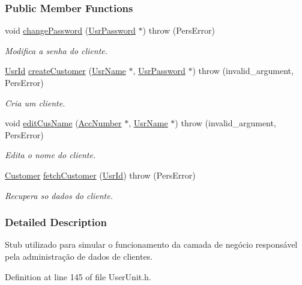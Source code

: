 \subsubsection*{Public Member Functions}
\begin{DoxyCompactItemize}
\item 
void \hyperlink{classStubUserCusAdm_a7e44bec3dc4fb0640e6eb418dd8e8320}{change\-Password} (\hyperlink{classUsrPassword}{Usr\-Password} $\ast$)  throw (\-Pers\-Error)
\begin{DoxyCompactList}\small\item\em Modifica a senha do cliente. \end{DoxyCompactList}\item 
\hyperlink{classUsrId}{Usr\-Id} \hyperlink{classStubUserCusAdm_a6b0c9fc7280045d06bf263d7286b37e9}{create\-Customer} (\hyperlink{classUsrName}{Usr\-Name} $\ast$, \hyperlink{classUsrPassword}{Usr\-Password} $\ast$)  throw (invalid\-\_\-argument, Pers\-Error)
\begin{DoxyCompactList}\small\item\em Cria um cliente. \end{DoxyCompactList}\item 
void \hyperlink{classStubUserCusAdm_a84ca3047ccb0ac2e371a23c4e4fcdba0}{edit\-Cus\-Name} (\hyperlink{classAccNumber}{Acc\-Number} $\ast$, \hyperlink{classUsrName}{Usr\-Name} $\ast$)  throw (invalid\-\_\-argument, Pers\-Error)
\begin{DoxyCompactList}\small\item\em Edita o nome do cliente. \end{DoxyCompactList}\item 
\hyperlink{classCustomer}{Customer} \hyperlink{classStubUserCusAdm_aac14b018a6284211b1c83c48a9529efe}{fetch\-Customer} (\hyperlink{classUsrId}{Usr\-Id})  throw (\-Pers\-Error)
\begin{DoxyCompactList}\small\item\em Recupera so dados do cliente. \end{DoxyCompactList}\end{DoxyCompactItemize}


\subsubsection{Detailed Description}
Stub utilizado para simular o funcionamento da camada de negócio responsável pela administração de dados de clientes. 

Definition at line 145 of file User\-Unit.\-h.




